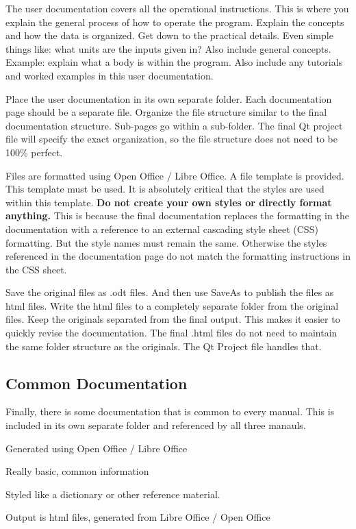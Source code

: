 The user documentation covers all the operational instructions. This is where you explain the general process of how to operate the program. Explain the concepts and how the data is organized. Get down to the practical details. Even simple things like\-: what units are the inputs given in? Also include general concepts. Example\-: explain what a body is within the program. Also include any tutorials and worked examples in this user documentation.

Place the user documentation in its own separate folder. Each documentation page should be a separate file. Organize the file structure similar to the final documentation structure. Sub-\/pages go within a sub-\/folder. The final Qt project file will specify the exact organization, so the file structure does not need to be 100\% perfect.

Files are formatted using Open Office / Libre Office. A file template is provided. This template must be used. It is absolutely critical that the styles are used within this template. {\bfseries Do not create your own styles or directly format anything.} This is because the final documentation replaces the formatting in the documentation with a reference to an external cascading style sheet (C\-S\-S) formatting. But the style names must remain the same. Otherwise the styles referenced in the documentation page do not match the formatting instructions in the C\-S\-S sheet.

Save the original files as .odt files. And then use Save\-As to publish the files as html files. Write the html files to a completely separate folder from the original files. Keep the originals separated from the final output. This makes it easier to quickly revise the documentation. The final .html files do not need to maintain the same folder structure as the originals. The Qt Project file handles that.\hypertarget{documentation_documentation_common}{}\subsection{Common Documentation}\label{documentation_documentation_common}
Finally, there is some documentation that is common to every manual. This is included in its own separate folder and referenced by all three manauls.
\begin{DoxyItemize}
\item Generated using Open Office / Libre Office
\item Really basic, common information
\item Styled like a dictionary or other reference material.
\item Output is html files, generated from Libre Office / Open Office
\end{DoxyItemize}

